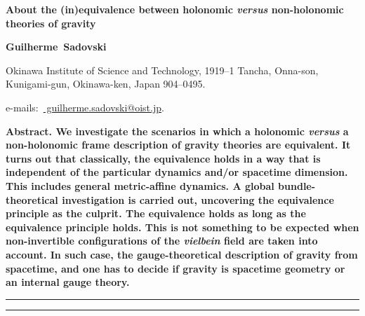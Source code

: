 \documentclass[../main.tex]{subfiles}
\begin{document}
\thispagestyle{empty}
{
  \noindent
  \Large
  \bfseries
  About the (in)equivalence between holonomic \textit{versus} non-holonomic theories of gravity
  \bigskip
  \bigskip
}

{
  \noindent
  \bfseries
  Guilherme~Sadovski
  \bigskip
}

{
  \noindent
  \footnotesize
  Okinawa Institute of Science and Technology, 1919--1 Tancha, Onna-son, Kunigami-gun, Okinawa-ken, Japan 904--0495.
  \bigskip
}

{
  \noindent
  \footnotesize
  \rmfamily
  e-mails:~\href{
    mailto:guilherme.sadovski@oist.jp
  }{
    guilherme.sadovski@oist.jp}{\normalfont.}
  \bigskip
}

{
  \noindent
  \bfseries
  Abstract.
  \normalfont
  We investigate the scenarios in which a holonomic \textit{versus} a non-holonomic frame description of gravity theories are equivalent. It turns out that classically, the equivalence holds in a way that is independent of the particular dynamics and/or spacetime dimension. This includes general metric-affine dynamics. A global bundle-theoretical investigation is carried out, uncovering the equivalence principle as the culprit. The equivalence holds as long as the equivalence principle holds. This is not something to be expected when non-invertible configurations of the \textit{vielbein} field are taken into account. In such case, the gauge-theoretical description of gravity  from spacetime, and one has to decide if gravity is spacetime geometry or an internal gauge theory.
  \bigskip
}

{
  \noindent
  \rule{.994\linewidth}{1pt}
  \tableofcontents
  \bigskip
  \noindent
  \rule{.994\linewidth}{1pt}
}
\end{document}
